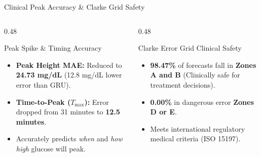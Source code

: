 \documentclass[aspectratio=169, 10pt]{beamer}
\begin{document}
\begin{frame}{Clinical Peak Accuracy \& Clarke Grid Safety}
  \begin{columns}[c]
    \begin{column}{0.48\textwidth}
      \begin{block}{Peak Spike \& Timing Accuracy}
        \begin{itemize}\setlength{\itemsep}{0.5em}
          \item \textbf{Peak Height MAE:} Reduced to \textbf{24.73 mg/dL} (12.8 mg/dL lower error than GRU).
          \item \textbf{Time-to-Peak ($T_{\max}$):} Error dropped from 31 minutes to \textbf{12.5 minutes}.
          \item Accurately predicts \emph{when} and \emph{how high} glucose will peak.
        \end{itemize}
      \end{block}
    \end{column}
    
    \begin{column}{0.48\textwidth}
      \begin{exampleblock}{Clarke Error Grid Clinical Safety}
        \begin{itemize}\setlength{\itemsep}{0.5em}
          \item \textbf{98.47\%} of forecasts fall in \textbf{Zones A and B} (Clinically safe for treatment decisions).
          \item \textbf{0.00\%} in dangerous error \textbf{Zones D or E}.
          \item Meets international regulatory medical criteria (ISO 15197).
        \end{itemize}
      \end{exampleblock}
    \end{column}
  \end{columns}
\end{frame}
\end{document}
